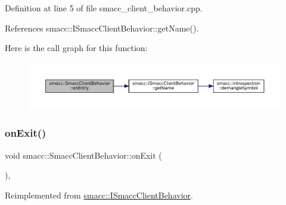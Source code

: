 Definition at line 5 of file smacc\+\_\+client\+\_\+behavior.\+cpp.



References smacc\+::\+I\+Smacc\+Client\+Behavior\+::get\+Name().


Here is the call graph for this function\+:
\nopagebreak
\begin{figure}[H]
\begin{center}
\leavevmode
\includegraphics[width=350pt]{classsmacc_1_1SmaccClientBehavior_ad5d3e1f1697c3cfe66c94cadba948493_cgraph}
\end{center}
\end{figure}
\mbox{\label{classsmacc_1_1SmaccClientBehavior_a7e4fb6ce81ff96dc172425852d69c0c5}} 
\subsubsection{\texorpdfstring{on\+Exit()}{onExit()}}
{\footnotesize\ttfamily void smacc\+::\+Smacc\+Client\+Behavior\+::on\+Exit (\begin{DoxyParamCaption}{ }\end{DoxyParamCaption})\hspace{0.3cm}{\ttfamily [override]}, {\ttfamily [virtual]}}



Reimplemented from \hyperlink{classsmacc_1_1ISmaccClientBehavior_a36bf771905e3bf750909a15e4215a9b3}{smacc\+::\+I\+Smacc\+Client\+Behavior}.



